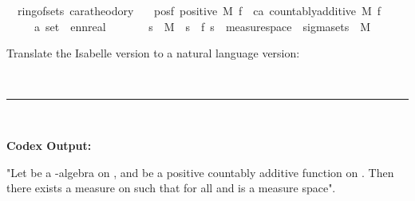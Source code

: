 \documentclass{article}
\begin{document}
\begin{boxB}
\begin{isabelle}
\isamarkupfalse \ {\isacharparenleft}{\kern0pt}\ ring{\isacharunderscore}{\kern0pt}of{\isacharunderscore}{\kern0pt}sets{\isacharparenright}{\kern0pt}\ caratheodory{\isacharprime}{\kern0pt}{\isacharcolon}{\kern0pt}\isanewline
\ \ \ posf{\isacharcolon}{\kern0pt}\ {\isachardoublequoteopen}positive\ M\ f{\isachardoublequoteclose}\ \ ca{\isacharcolon}{\kern0pt}\ {\isachardoublequoteopen}countably{\isacharunderscore}{\kern0pt}additive\ M\ f{\isachardoublequoteclose}\isanewline
\ \ \ {\isachardoublequoteopen}{\isasymexists}{\isasymmu}\ {\isacharcolon}{\kern0pt}{\isacharcolon}{\kern0pt}\ {\isacharprime}{\kern0pt}a\ set\ {\isasymRightarrow}\ ennreal{\isachardot}{\kern0pt}\ \isanewline
\ \ \ \ \ \ {\isacharparenleft}{\kern0pt}{\isasymforall}s\ {\isasymin}\ M{\isachardot}{\kern0pt}\ {\isasymmu}\ s\ {\isacharequal}{\kern0pt}\ f\ s{\isacharparenright}{\kern0pt}\ {\isasymand}\ measure{\isacharunderscore}{\kern0pt}space\ {\isasymOmega}\ {\isacharparenleft}{\kern0pt}sigma{\isacharunderscore}{\kern0pt}sets\ {\isasymOmega}\ M{\isacharparenright}{\kern0pt}\ {\isasymmu}{\isachardoublequoteclose}
\end{isabelle}
Translate the Isabelle version to a natural language version:

\
\hrule
\

\textbf{Codex Output:}

"Let  be a -algebra on , and  be a positive countably additive function on . Then there exists a measure  on  such that  for all  and  is a measure space".
\end{boxB}
\end{document}
